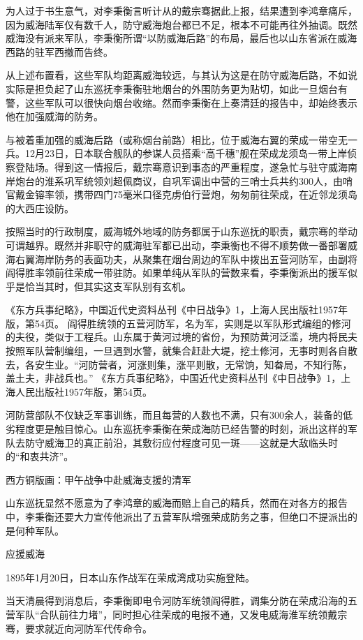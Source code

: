\documentclass[12pt,UTF8]{ctexbook}
\begin{document}
为人过于书生意气，对李秉衡言听计从的戴宗骞据此上报，结果遭到李鸿章痛斥，因为威海陆军仅有数千人，防守威海炮台都已不足，根本不可能再往外抽调。既然威海没有派来军队，李秉衡所谓“以防威海后路”的布局，最后也以山东省派在威海西路的驻军西撤而告终。

从上述布置看，这些军队均距离威海较远，与其认为这是在防守威海后路，不如说实际是担负起了山东巡抚李秉衡驻地烟台的外围防务更为贴切，如此一旦烟台有警，这些军队可以很快向烟台收缩。然而李秉衡在上奏清廷的报告中，却始终表示他在加强威海的防务。

与被着重加强的威海后路（或称烟台前路）相比，位于威海右翼的荣成一带空无一兵。12月23日，日本联合舰队的参谋人员搭乘“高千穗”舰在荣成龙须岛一带上岸侦察登陆场。得到这一情报后，戴宗骞意识到事态的严重程度，遂急忙与驻守威海南岸炮台的淮系巩军统领刘超佩商议，自巩军调出中营的三哨士兵共约300人，由哨官戴金镕率领，携带四门75毫米口径克虏伯行营炮，匆匆前往荣成，在近邻龙须岛的大西庄设防。

按照当时的行政制度，威海城外地域的防务都属于山东巡抚的职责，戴宗骞的举动可谓越界。既然并非职守的威海驻军都已出动，李秉衡也不得不顺势做一番部署威海右翼海岸防务的表面功夫，从聚集在烟台周边的军队中拨出五营河防军，由副将阎得胜率领前往荣成一带驻防。如果单纯从军队的营数来看，李秉衡派出的援军似乎是恰当其时，但其实这支军队别有玄机。

《东方兵事纪略》，中国近代史资料丛刊《中日战争》1，上海人民出版社1957年版，第54页。
阎得胜统领的五营河防军，名为军，实则是以军队形式编组的修河的夫役，类似于工程兵。山东属于黄河过境的省份，为预防黄河泛滥，境内将民夫按照军队营制编组，一旦遇到水警，就集合赶赴大堤，挖土修河，无事时则各自散去，各安生业。“河防营者，河涨则集，涨平则散，无常饷，知畚局，不知行陈，盖土夫，非战兵也。” 《东方兵事纪略》，中国近代史资料丛刊《中日战争》1，上海人民出版社1957年版，第54页。

河防营部队不仅缺乏军事训练，而且每营的人数也不满，只有300余人，装备的低劣程度更是触目惊心。山东巡抚李秉衡在荣成海防已经告警的时刻，派出这样的军队去防守威海卫的真正前沿，其敷衍应付程度可见一斑——这就是大敌临头时的“和衷共济”。


西方铜版画：甲午战争中赴威海支援的清军

山东巡抚显然不愿意为了李鸿章的威海而赔上自己的精兵，然而在对各方的报告中，李秉衡还要大力宣传他派出了五营军队增强荣成防务之事，但绝口不提派出的是何种军队。

应援威海

1895年1月20日，日本山东作战军在荣成湾成功实施登陆。

当天清晨得到消息后，李秉衡即电令河防军统领阎得胜，调集分防在荣成沿海的五营军队“合队前往力堵”，同时担心往荣成的电报不通，又发电威海淮军统领戴宗骞，要求就近向河防军代传命令。
\end{document}
